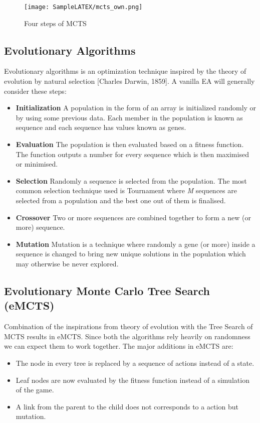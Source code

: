 \documentclass{llncs}
\begin{document}
\begin{figure}
    \centering
    \texttt{[image: SampleLATEX/mcts\_own.png]}
    \caption{Four steps of MCTS}
    \label{fig:MCTS}
\end{figure}

\subsection{Evolutionary Algorithms}

\noindent
Evolutionary algorithms is an optimization technique inspired by the  theory of evolution by natural selection [Charles Darwin, 1859]. A vanilla EA will generally consider these steps:

\noindent
\begin{itemize}
    \item \textbf{Initialization} A population in the form of an array is initialized randomly or by using some previous data. Each member in the population is known as sequence and each sequence has values known as genes. 
    \item \textbf{Evaluation} The population is then evaluated based on a fitness function. The function outputs a number for every sequence which is then maximised or minimised. 
    \item \textbf{Selection}  Randomly a sequence is selected from the population. The most common selection technique used is Tournament where \emph{M} sequences are selected from a population and the best one out of them is finalised.
    \item \textbf{Crossover} Two or more sequences are combined together to form a new (or more) sequence. 
    \item \textbf{Mutation} Mutation is a technique where randomly a gene (or more) inside a sequence is changed to bring new unique solutions in the population which may otherwise be never explored. 
\end{itemize}

\subsection{Evolutionary Monte Carlo Tree Search (eMCTS)}
Combination of the inspirations from theory of evolution with the Tree Search of MCTS results in eMCTS. Since both the algorithms rely heavily on randomness we can expect them to work together. The major additions in eMCTS are:
\begin{itemize}
    \item The node in every tree is replaced by a sequence of actions instead of a state.
    \item Leaf nodes are now evaluated by the fitness function instead of a simulation of the game. 
    \item A link from the parent to the child does not corresponds to a action but mutation. 
\end{itemize}
\end{document}
